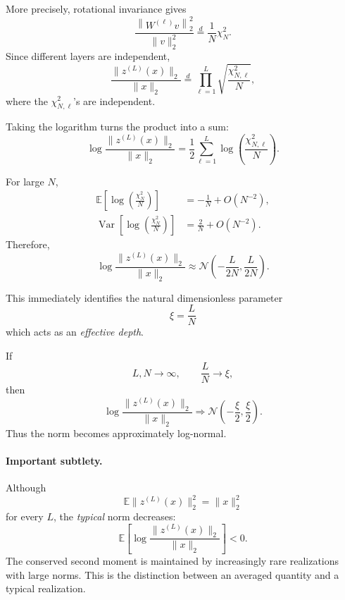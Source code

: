 More precisely, rotational invariance gives
\begin{equation}
    \frac{
        \left\|W^{(\ell)}v\right\|_2^2
    }{
        \|v\|_2^2
    }
    \overset{d}{=}
    \frac{1}{N}\chi_N^2.
\end{equation}
Since different layers are independent,
\begin{equation}
    \frac{\|z^{(L)}(x)\|_2}{\|x\|_2}
    \overset{d}{=}
    \prod_{\ell=1}^L
    \sqrt{\frac{\chi_{N,\ell}^2}{N}},
\end{equation}
where the \(\chi_{N,\ell}^2\)'s are independent.

Taking the logarithm turns the product into a sum:
\begin{equation}
    \log
    \frac{\|z^{(L)}(x)\|_2}{\|x\|_2}
    =
    \frac{1}{2}
    \sum_{\ell=1}^L
    \log\left(
        \frac{\chi_{N,\ell}^2}{N}
    \right).
\end{equation}

For large \(N\),
\begin{align}
    \mathbb{E}
    \left[
        \log\left(
            \frac{\chi_N^2}{N}
        \right)
    \right]
    &=
    -\frac{1}{N}
    +
    O(N^{-2}),
    \\
    \operatorname{Var}
    \left[
        \log\left(
            \frac{\chi_N^2}{N}
        \right)
    \right]
    &=
    \frac{2}{N}
    +
    O(N^{-2}).
\end{align}
Therefore,
\begin{equation}
    \log
    \frac{\|z^{(L)}(x)\|_2}{\|x\|_2}
    \approx
    \mathcal{N}\!\left(
        -\frac{L}{2N},
        \frac{L}{2N}
    \right).
\end{equation}

This immediately identifies the natural dimensionless parameter
\begin{equation}
    \boxed{
        \xi=\frac{L}{N}
    }
\end{equation}
which acts as an \emph{effective depth}.

If
\[
L,N\rightarrow\infty,
\qquad
\frac{L}{N}\rightarrow\xi,
\]
then
\begin{equation}
    \boxed{
    \log
    \frac{\|z^{(L)}(x)\|_2}{\|x\|_2}
    \Longrightarrow
    \mathcal{N}
    \left(
        -\frac{\xi}{2},
        \frac{\xi}{2}
    \right).
    }
\end{equation}
Thus the norm becomes approximately log-normal.

\paragraph{Important subtlety.}
Although
\begin{equation}
    \mathbb{E}\|z^{(L)}(x)\|_2^2
    =
    \|x\|_2^2
\end{equation}
for every \(L\), the \emph{typical} norm decreases:
\[
\mathbb{E}
\left[
    \log
    \frac{\|z^{(L)}(x)\|_2}{\|x\|_2}
\right]
<0.
\]
The conserved second moment is maintained by increasingly rare
realizations with large norms.  This is the distinction between
an averaged quantity and a typical realization.

